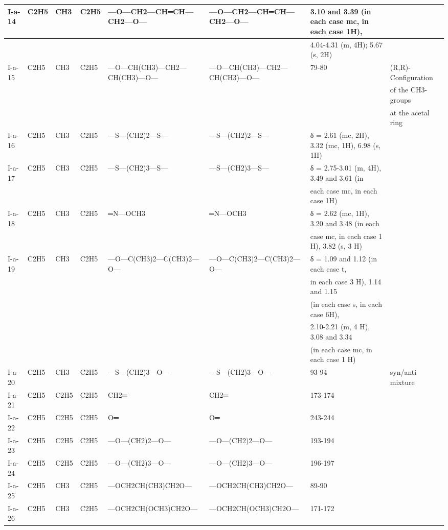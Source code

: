 \documentclass[11pt,a4paper]{article}
\begin{document}
\begin{table}[h]
\begin{tabular}{|l|l|l|l|l|l|l|l|}
I-a-14 & C2H5 & CH3 & C2H5 & —O—CH2—CH═CH—CH2—O— & —O—CH2—CH═CH—CH2—O— & 3.10 and 3.39 (in each case mc, in each case 1H), &  \\ \hline
 &  &  &  &  &  & 4.04-4.31 (m, 4H); 5.67 (s, 2H) &  \\ \hline
I-a-15 & C2H5 & CH3 & C2H5 & —O—CH(CH3)—CH2—CH(CH3)—O— & —O—CH(CH3)—CH2—CH(CH3)—O— & 79-80 & (R,R)-Configuration \\ \hline
 &  &  &  &  &  &  & of the CH3-groups \\ \hline
 &  &  &  &  &  &  & at the acetal ring \\ \hline
I-a-16 & C2H5 & CH3 & C2H5 & —S—(CH2)2—S— & —S—(CH2)2—S— & δ = 2.61 (mc, 2H), 3.32 (mc, 1H), 6.98 (s, 1H) &  \\ \hline
I-a-17 & C2H5 & CH3 & C2H5 & —S—(CH2)3—S— & —S—(CH2)3—S— & δ = 2.75-3.01 (m, 4H), 3.49 and 3.61 (in &  \\ \hline
 &  &  &  &  &  & each case mc, in each case 1H) &  \\ \hline
I-a-18 & C2H5 & CH3 & C2H5 & ═N—OCH3 & ═N—OCH3 & δ = 2.62 (mc, 1H), 3.20 and 3.48 (in each &  \\ \hline
 &  &  &  &  &  & case mc, in each case 1 H), 3.82 (s, 3 H) &  \\ \hline
I-a-19 & C2H5 & CH3 & C2H5 & —O—C(CH3)2—C(CH3)2—O— & —O—C(CH3)2—C(CH3)2—O— & δ = 1.09 and 1.12 (in each case t, &  \\ \hline
 &  &  &  &  &  & in each case 3 H), 1.14 and 1.15 &  \\ \hline
 &  &  &  &  &  & (in each case s, in each case 6H), &  \\ \hline
 &  &  &  &  &  & 2.10-2.21 (m, 4 H), 3.08 and 3.34 &  \\ \hline
 &  &  &  &  &  & (in each case mc, in each case 1 H) &  \\ \hline
I-a-20 & C2H5 & CH3 & C2H5 & —S—(CH2)3—O— & —S—(CH2)3—O— & 93-94 & syn/anti mixture \\ \hline
I-a-21 & C2H5 & C2H5 & C2H5 & CH2═ & CH2═ & 173-174 &  \\ \hline
I-a-22 & C2H5 & C2H5 & C2H5 & O═ & O═ & 243-244 &  \\ \hline
I-a-23 & C2H5 & C2H5 & C2H5 & —O—(CH2)2—O— & —O—(CH2)2—O— & 193-194 &  \\ \hline
I-a-24 & C2H5 & C2H5 & C2H5 & —O—(CH2)3—O— & —O—(CH2)3—O— & 196-197 &  \\ \hline
I-a-25 & C2H5 & CH3 & C2H5 & —OCH2CH(CH3)CH2O— & —OCH2CH(CH3)CH2O— & 89-90 &  \\ \hline
I-a-26 & C2H5 & CH3 & C2H5 & —OCH2CH(OCH3)CH2O— & —OCH2CH(OCH3)CH2O— & 171-172 &  \\ \hline

\end{tabular}
\end{table}
\end{document}
